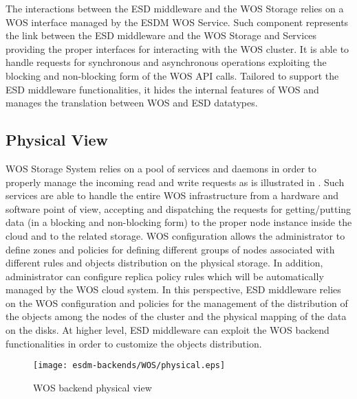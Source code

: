 The interactions between the ESD middleware and the WOS Storage relies on a WOS interface managed by the ESDM WOS Service. Such component represents the link between the ESD middleware and the WOS Storage and Services providing the proper interfaces for interacting with the WOS cluster. It is able to handle requests for synchronous and asynchronous operations exploiting the blocking and non-blocking form of the WOS API calls. Tailored to support the ESD middleware functionalities, it hides the internal features of WOS and manages the translation between WOS and ESD datatypes.  


\subsection{Physical View}

WOS Storage System relies on a pool of services and daemons in order to properly manage the incoming read and write requests as is illustrated in .
Such services are able to handle the entire WOS infrastructure from a hardware and software point of view, accepting and dispatching the requests for getting/putting data (in a blocking and non-blocking form) to the proper node instance inside the cloud and to the related storage. 
WOS configuration allows the administrator to define zones and policies for defining different groups of nodes associated with different rules and objects distribution on the physical storage.
In addition, administrator can configure replica policy rules which will be automatically managed by the WOS cloud system. 
In this perspective, ESD middleware relies on the WOS configuration and policies for the management of the distribution of the objects among the nodes of the cluster and the physical mapping of the data on the disks. 
At higher level, ESD middleware can exploit the WOS backend functionalities in order to customize the objects distribution.


\begin{figure}
	\centering
	\texttt{[image: esdm-backends/WOS/physical.eps]}
	\caption{WOS backend physical view}
	\label{fig:WOS backend physical view}
\end{figure}



